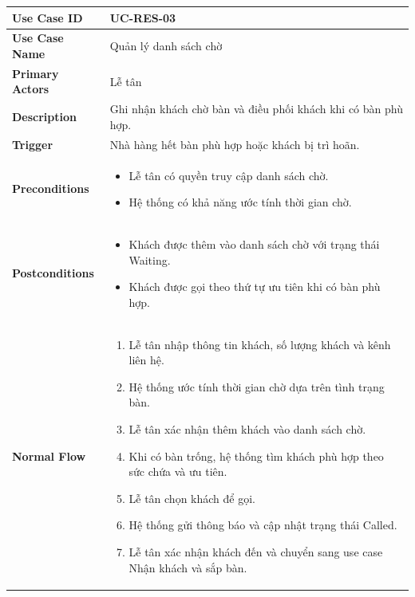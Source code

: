     \renewcommand{\arraystretch}{1.3}

\begin{longtable}{|p{4cm}|p{10cm}|}
\hline
\textbf{Use Case ID} & UC-RES-03 \\ \hline
\textbf{Use Case Name} & Quản lý danh sách chờ \\ \hline
\textbf{Primary Actors} & Lễ tân \\ \hline

\textbf{Description} & Ghi nhận khách chờ bàn và điều phối khách khi có bàn phù hợp. \\ \hline

\textbf{Trigger} & Nhà hàng hết bàn phù hợp hoặc khách bị trì hoãn. \\ \hline

\textbf{Preconditions} &
\begin{itemize}[leftmargin=*, noitemsep]
  \item Lễ tân có quyền truy cập danh sách chờ.
  \item Hệ thống có khả năng ước tính thời gian chờ.
\end{itemize} \\ \hline

\textbf{Postconditions} &
\begin{itemize}[leftmargin=*, noitemsep]
  \item Khách được thêm vào danh sách chờ với trạng thái \textsf{Waiting}.
  \item Khách được gọi theo thứ tự ưu tiên khi có bàn phù hợp.
\end{itemize} \\ \hline

\textbf{Normal Flow} &
\begin{enumerate}[leftmargin=*, noitemsep]
  \item Lễ tân nhập thông tin khách, số lượng khách và kênh liên hệ.
  \item Hệ thống ước tính thời gian chờ dựa trên tình trạng bàn.
  \item Lễ tân xác nhận thêm khách vào danh sách chờ.
  \item Khi có bàn trống, hệ thống tìm khách phù hợp theo sức chứa và ưu tiên.
  \item Lễ tân chọn khách để gọi.
  \item Hệ thống gửi thông báo và cập nhật trạng thái \textsf{Called}.
  \item Lễ tân xác nhận khách đến và chuyển sang use case Nhận khách và sắp bàn.
\end{enumerate} \\ \hline


\end{longtable}
